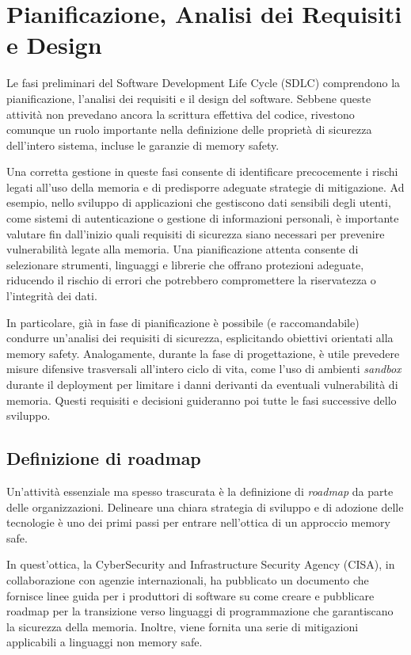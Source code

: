 \section{Pianificazione, Analisi dei Requisiti e Design}
\label{sec:planning_requirements_design}

Le fasi preliminari del Software Development Life Cycle (SDLC) comprendono la pianificazione,
l'analisi dei requisiti e il design del software. Sebbene queste attività non prevedano
ancora la scrittura effettiva del codice, rivestono comunque un ruolo importante
nella definizione delle proprietà di sicurezza dell'intero sistema, incluse le garanzie
di memory safety.

Una corretta gestione in queste fasi consente di identificare precocemente i rischi
legati all'uso della memoria e di predisporre adeguate strategie di mitigazione.
Ad esempio, nello sviluppo di applicazioni che gestiscono dati sensibili degli utenti,
come sistemi di autenticazione o gestione di informazioni personali, è importante
valutare fin dall'inizio quali requisiti di sicurezza siano necessari per prevenire
vulnerabilità legate alla memoria. Una pianificazione attenta consente di
selezionare strumenti, linguaggi e librerie che offrano protezioni adeguate,
riducendo il rischio di errori che potrebbero compromettere la riservatezza o l'integrità
dei dati.

In particolare, già in fase di pianificazione è possibile (e raccomandabile) condurre
un'analisi dei requisiti di sicurezza, esplicitando obiettivi orientati alla
memory safety. Analogamente, durante la fase di progettazione, è utile prevedere
misure difensive trasversali all'intero ciclo di vita, come l'uso di ambienti
\textit{sandbox} durante il deployment per limitare i danni derivanti da eventuali
vulnerabilità di memoria. Questi requisiti e decisioni guideranno poi tutte le
fasi successive dello sviluppo.

\subsection{Definizione di roadmap}
\label{sec:roadmap} Un'attività essenziale ma spesso trascurata è la definizione
di \textit{roadmap} da parte delle organizzazioni. Delineare una chiara
strategia di sviluppo e di adozione delle tecnologie è uno dei primi passi per
entrare nell'ottica di un approccio memory safe.

In quest'ottica, la CyberSecurity and Infrastructure Security Agency (CISA), in
collaborazione con agenzie internazionali, ha pubblicato un documento\cite{memory_safe_roadmaps}
che fornisce linee guida per i produttori di software su come creare e
pubblicare roadmap per la transizione verso linguaggi di programmazione che
garantiscano la sicurezza della memoria. Inoltre, viene fornita una serie di
mitigazioni applicabili a linguaggi non memory safe.

